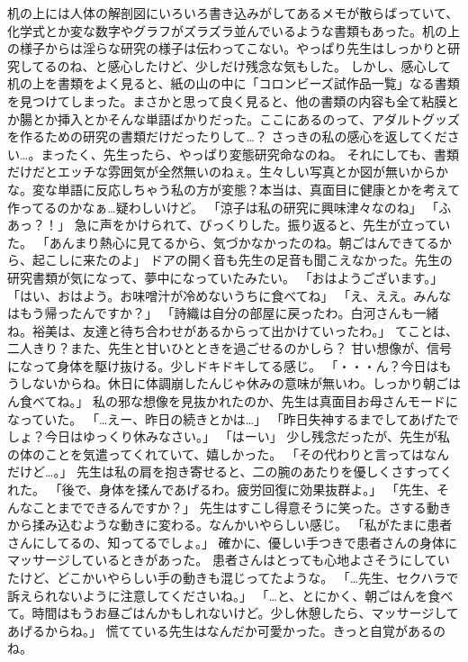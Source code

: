 机の上には人体の解剖図にいろいろ書き込みがしてあるメモが散らばっていて、化学式とか変な数字やグラフがズラズラ並んでいるような書類もあった。机の上の様子からは淫らな研究の様子は伝わってこない。やっぱり先生はしっかりと研究してるのね、と感心したけど、少しだけ残念な気もした。
しかし、感心して机の上を書類をよく見ると、紙の山の中に「コロンビーズ試作品一覧」なる書類を見つけてしまった。まさかと思って良く見ると、他の書類の内容も全て粘膜とか腸とか挿入とかそんな単語ばかりだった。ここにあるのって、アダルトグッズを作るための研究の書類だけだったりして…？
さっきの私の感心を返してください…。まったく、先生ったら、やっぱり変態研究命なのね。
それにしても、書類だけだとエッチな雰囲気が全然無いのねぇ。生々しい写真とか図が無いからかな。変な単語に反応しちゃう私の方が変態？本当は、真面目に健康とかを考えて作ってるのかなぁ…疑わしいけど。
「涼子は私の研究に興味津々なのね」
「ふあっ？！」
急に声をかけられて、びっくりした。振り返ると、先生が立っていた。
「あんまり熱心に見てるから、気づかなかったのね。朝ごはんできてるから、起こしに来たのよ」
ドアの開く音も先生の足音も聞こえなかった。先生の研究書類が気になって、夢中になっていたみたい。
「おはようございます。」
「はい、おはよう。お味噌汁が冷めないうちに食べてね」
「え、ええ。みんなはもう帰ったんですか？」
「詩織は自分の部屋に戻ったわ。白河さんも一緒ね。裕美は、友達と待ち合わせがあるからって出かけていったわ。」
てことは、二人きり？また、先生と甘いひとときを過ごせるのかしら？
甘い想像が、信号になって身体を駆け抜ける。少しドキドキしてる感じ。
「・・・ん？今日はもうしないからね。休日に体調崩したんじゃ休みの意味が無いわ。しっかり朝ごはん食べてね。」
私の邪な想像を見抜かれたのか、先生は真面目お母さんモードになっていた。
「…えー、昨日の続きとかは…」
「昨日失神するまでしてあげたでしょ？今日はゆっくり休みなさい。」
「はーい」
少し残念だったが、先生が私の体のことを気遣ってくれていて、嬉しかった。
「その代わりと言ってはなんだけど…。」
先生は私の肩を抱き寄せると、二の腕のあたりを優しくさすってくれた。
「後で、身体を揉んであげるわ。疲労回復に効果抜群よ。」
「先生、そんなことまでできるんですか？」
先生はすこし得意そうに笑った。さする動きから揉み込むような動きに変わる。なんかいやらしい感じ。
「私がたまに患者さんにしてるの、知ってるでしょ。」
確かに、優しい手つきで患者さんの身体にマッサージしているときがあった。
患者さんはとっても心地よさそうにしていたけど、どこかいやらしい手の動きも混じってたような。
「…先生、セクハラで訴えられないように注意してくださいね。」
「…と、とにかく、朝ごはんを食べて。時間はもうお昼ごはんかもしれないけど。少し休憩したら、マッサージしてあげるからね。」
慌てている先生はなんだか可愛かった。きっと自覚があるのね。

